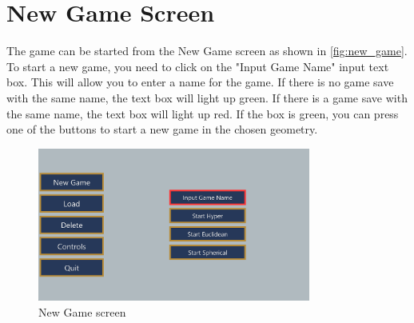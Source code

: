 \section{New Game Screen}
The game can be started from the New Game screen as shown in \autoref{fig:new_game}.
To start a new game, you need to click on the "Input Game Name" input text box.
This will allow you to enter a name for the game.
If there is no game save with the same name, the text box will light up green.
If there is a game save with the same name, the text box will light up red.
If the box is green, you can press one of the buttons to start a new game in the chosen geometry.

\begin{figure}[H]
    \centering
    \includegraphics[width=0.8\textwidth]{chapters/user_manual/resources/new-game-no-input.png}
    \caption{New Game screen}
    \label{fig:new_game}
\end{figure}